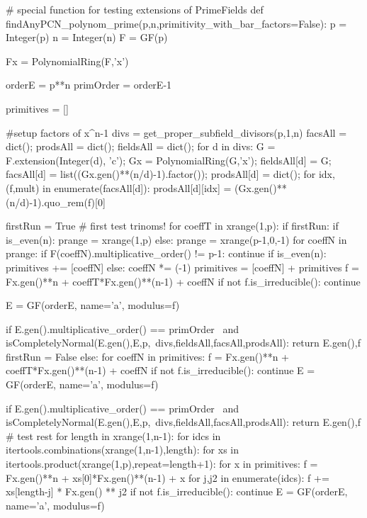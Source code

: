 \begin{sagecode}[caption={[\texttt{findAnyPCN\_polynom\_prime} aus 
 \url{../Sage/findAnyPCN_trinom.spyx}]Aus \url{../Sage/findAnyPCN_trinom.spyx}},
  label=lst:findAnyPCN_polynom_prime]
# special function for testing extensions of PrimeFields
def findAnyPCN_polynom_prime(p,n,primitivity_with_bar_factors=False):
    p = Integer(p)
    n = Integer(n)
    F = GF(p)
    
    Fx = PolynomialRing(F,'x')
    
    orderE = p**n
    primOrder = orderE-1

    primitives = []

    #setup factors of x^n-1
    divs = get_proper_subfield_divisors(p,1,n)
    facsAll = dict();
    prodsAll = dict();
    fieldsAll = dict();
    for d in divs:
        G = F.extension(Integer(d), 'c');
        Gx = PolynomialRing(G,'x');
        fieldsAll[d] = G;
        facsAll[d] = list((Gx.gen()**(n/d)-1).factor());
        prodsAll[d] = dict();
        for idx,(f,mult) in enumerate(facsAll[d]):
            prodsAll[d][idx] = (Gx.gen()**(n/d)-1).quo_rem(f)[0]

    firstRun = True
    # first test trinoms!
    for coeffT in xrange(1,p):
        if firstRun:
            if is_even(n):
                prange = xrange(1,p)
            else:
                prange = xrange(p-1,0,-1)
            for coeffN in prange:
                if F(coeffN).multiplicative_order() != p-1: continue
                if is_even(n):
                    primitives += [coeffN]
                else:
                    coeffN *= (-1)
                    primitives = [coeffN] + primitives
                f = Fx.gen()**n + coeffT*Fx.gen()**(n-1) + coeffN
                if not f.is_irreducible(): continue
                
                E = GF(orderE, name='a', modulus=f)

                if E.gen().multiplicative_order() == primOrder \
                        and isCompletelyNormal(E.gen(),E,p,\
                            divs,fieldsAll,facsAll,prodsAll):
                    return E.gen(),f
            firstRun = False
        else:
            for coeffN in primitives:
                f = Fx.gen()**n + coeffT*Fx.gen()**(n-1) + coeffN
                if not f.is_irreducible(): continue
                E = GF(orderE, name='a', modulus=f)

                if E.gen().multiplicative_order() == primOrder \
                        and isCompletelyNormal(E.gen(),E,p,\
                            divs,fieldsAll,facsAll,prodsAll):
                    return E.gen(),f
    # test rest
    for length in xrange(1,n-1):
        for idcs in itertools.combinations(xrange(1,n-1),length):
            for xs in itertools.product(xrange(1,p),repeat=length+1):
                for x in primitives:
                    f = Fx.gen()**n + xs[0]*Fx.gen()**(n-1) + x
                    for j,j2 in enumerate(idcs):
                        f += xs[length-j] * Fx.gen() ** j2
                    if not f.is_irreducible(): continue
                    E = GF(orderE, name='a', modulus=f)


\end{sagecode}
